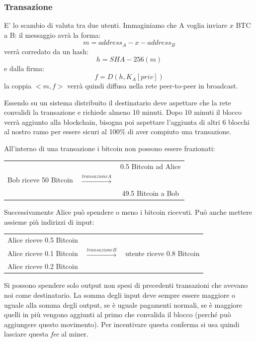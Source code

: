 \subsubsection{Transazione}
E' lo scambio di valuta tra due utenti. Immaginiamo che A voglia inviare $x$ BTC a B: il messaggio avrà la forma:
$$ m = address_A - x - address_B$$
verrà corredato da un hash:
$$ h = SHA-256(m)$$
e dalla firma:
$$ f = D(h, K_A[priv]) $$
la coppia $<m, f>$ verrà quindi diffusa nella rete peer-to-peer in broadcast.

Essendo su un sistema distribuito il destinatario deve aspettare che la rete convalidi la transazione e richiede almeno 10 minuti.
Dopo 10 minuti il blocco verrà aggiunto alla blockchain, bisogna poi aspettare l'aggiunta di altri 6 blocchi al nostro ramo per essere sicuri al 100\% di aver compiuto una transazione.

All'interno di una transazione i bitcoin non possono essere frazionati:
\begin{table}[ht!]
    \centering
    \begin{tabular}{c c c}
         &  & 0.5 Bitcoin ad Alice \\
        Bob riceve 50 Bitcoin &  $\xrightarrow{transazione A}$ &\\
         & & 49.5 Bitcoin a Bob
    \end{tabular}
\end{table}

Successivamente Alice può spendere o meno i bitcoin ricevuti.
Può anche mettere assieme più indirizzi di input:
\begin{table}[ht!]
    \centering
    \begin{tabular}{c c c}
        Alice riceve 0.5 Bitcoin & & \\
        Alice riceve 0.1 Bitcoin & $\xrightarrow{transazione B}$ & utente riceve 0.8 Bitcoin\\
        Alice riceve 0.2 Bitcoin & &
    \end{tabular}
\end{table}

Si possono spendere solo output non spesi di precedenti transazioni che avevano noi come destinatario.
La somma degli input deve sempre essere maggiore o uguale alla somma degli output, se è uguale pagamenti normali, se è maggiore quelli in più vengono aggiunti al primo che convalida il blocco (perché può aggiungere questo movimento).
Per incentivare questa conferma si usa quindi lasciare questa \emph{fee} al miner.

